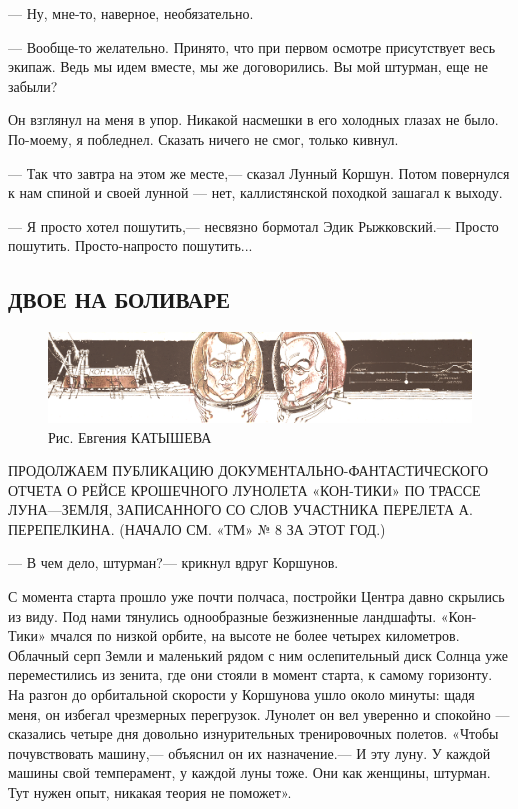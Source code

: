 \documentclass[11pt,a4paper,oneside]{article}
\begin{document}
— Ну, мне-то, наверное, необязательно.

— Вообще-то желательно. Принято, что при первом осмотре присутствует весь экипаж. Ведь мы идем вместе, мы же договорились. Вы мой штурман, еще не забыли?

Он взглянул на меня в упор. Никакой насмешки в его холодных глазах не было. По-моему, я побледнел. Сказать ничего не смог, только кивнул.

— Так что завтра на этом же месте,— сказал Лунный Коршун. Потом повернулся к нам спиной и своей лунной — нет, каллистянской походкой зашагал к выходу.

— Я просто хотел пошутить,— несвязно бормотал Эдик Рыжковский.— Просто пошутить. Просто-напросто пошутить...

\subsection{ДВОЕ НА БОЛИВАРЕ}
\label{bolivar}
\begin{figure}[H]
\includegraphics[width=\textwidth]{bolivar}
\caption{Рис. Евгения КАТЫШЕВА}
\end{figure}

ПРОДОЛЖАЕМ ПУБЛИКАЦИЮ ДОКУМЕНТАЛЬНО-ФАНТАСТИЧЕСКОГО ОТЧЕТА О РЕЙСЕ КРОШЕЧНОГО ЛУНОЛЕТА «КОН-ТИКИ» ПО ТРАССЕ ЛУНА—ЗЕМЛЯ, ЗАПИСАННОГО СО СЛОВ УЧАСТНИКА ПЕРЕЛЕТА А. ПЕРЕПЕЛКИНА. (НАЧАЛО СМ. «ТМ» № 8 ЗА ЭТОТ ГОД.)

— В чем дело, штурман?— крикнул вдруг Коршунов.

С момента старта прошло уже почти полчаса, постройки Центра давно скрылись из виду. Под нами тянулись однообразные безжизненные ландшафты. «Кон-Тики» мчался по низкой орбите, на высоте не более четырех километров. Облачный серп Земли и маленький рядом с ним ослепительный диск Солнца уже переместились из зенита, где они стояли в момент старта, к самому горизонту. На разгон до орбитальной скорости у Коршунова ушло около минуты: щадя меня, он избегал чрезмерных перегрузок. Лунолет он вел уверенно и спокойно — сказались четыре дня довольно изнурительных тренировочных полетов. «Чтобы почувствовать машину,— объяснил он их назначение.— И эту луну. У каждой машины свой темперамент, у каждой луны тоже. Они как женщины, штурман. Тут нужен опыт, никакая теория не поможет».
\end{document}

